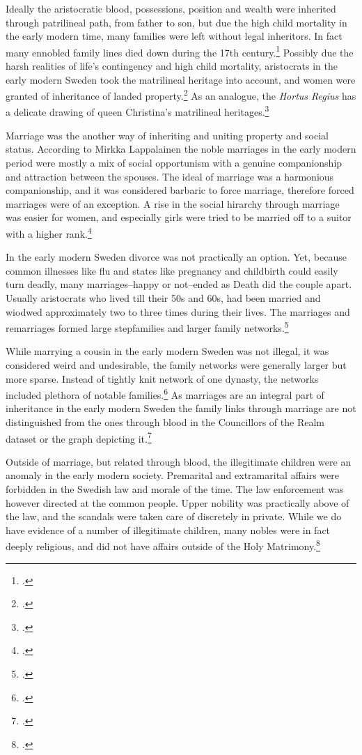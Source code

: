 Ideally the aristocratic blood, possessions, position and wealth were inherited through patrilineal path, from father to son, but due the high child mortality in the early modern time, many families were left without legal inheritors. In fact many ennobled family lines died down during the 17th century.\footcite[pp. 158-160.]{lappalainen06} Possibly due the harsh realities of life's contingency and high child mortality, aristocrats in the early modern Sweden took the matrilineal heritage into account, and women were granted of inheritance of landed property.\footcites[p. 43]{lahtinen2020}[p. 40.]{lappalainen06} As an analogue, the \textit{Hortus Regius} has a delicate drawing of queen Christina's matrilineal heritages.\footcite{hortusregius}

Marriage was the another way of inheriting and uniting property and social status. According to Mirkka Lappalainen the noble marriages in the early modern period were mostly a mix of social opportunism with a genuine companionship and attraction between the spouses. The ideal of marriage was a harmonious companionship, and it was considered barbaric to force marriage, therefore forced marriages were of an exception. A rise in the social hirarchy through marriage was easier for women, and especially girls were tried to be married off to a suitor with a higher rank.\footcite[pp. 33-42.]{lappalainen06}

In the early modern Sweden divorce was not practically an option. Yet, because common illnesses like flu and states like pregnancy and childbirth could easily turn deadly, many marriages–happy or not–ended as Death did the couple apart. Usually aristocrats who lived till their 50s and 60s, had been married and wiodwed approximately two to three times during their lives. The marriages and remarriages formed large stepfamilies and larger family networks.\footcite[pp. 35-42.]{lappalainen06}

While marrying a cousin in the early modern Sweden was not illegal, it was considered weird and undesirable, the family networks were generally larger but more sparse. Instead of tightly knit network of one dynasty, the networks included plethora of notable families.\footcite[p. 40.]{lappalainen06} As marriages are an integral part of inheritance in the early modern Sweden the family links through marriage are not distinguished from the ones through blood in the Councillors of the Realm dataset or the graph depicting it.\footcite{councillorsDS}

Outside of marriage, but related through blood, the illegitimate children were an anomaly in the early modern society. Premarital and extramarital affairs were forbidden in the Swedish law and morale of the time. The law enforcement was however directed at the common people. Upper nobility was practically above of the law, and the scandals were taken care of discretely in private. While we do have evidence of a number of illegitimate children, many nobles were in fact deeply religious, and did not have affairs outside of the Holy Matrimony.\footcite[pp. 36-37.]{lappalainen06}

